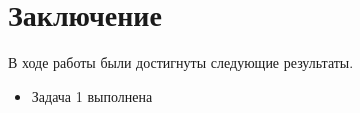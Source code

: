 
\section{Заключение}

В ходе работы были достигнуты следующие результаты.

\begin{itemize}
    \item Задача 1 выполнена
\end{itemize}
